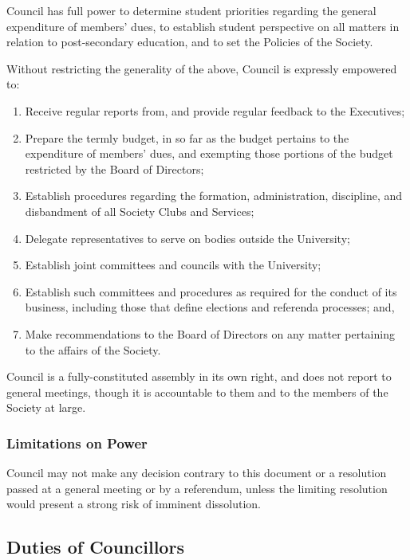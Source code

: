 Council has full power to determine student priorities regarding the
general expenditure of members’ dues, to establish student perspective on all
matters in relation to post-secondary education, and to set the Policies of the
Society.

Without restricting the generality of the above, Council is expressly
empowered to:
\begin{enumerate}
    \item Receive regular reports from, and provide regular feedback to the
        Executives;
    \item Prepare the termly budget, in so far as the budget pertains to the 
        expenditure of members’ dues, and
        exempting those portions of the budget restricted by the Board of 
        Directors;
    \item Establish procedures regarding the formation, administration,
        discipline, and disbandment of all Society Clubs and Services;
    \item Delegate representatives to serve on bodies outside the University;
    \item Establish joint committees and councils with the University;
    \item Establish such committees and procedures as required for the conduct
        of its business, including those that define elections and referenda
        processes; and,
    \item Make recommendations to the Board of Directors on any matter
        pertaining to the affairs of the Society.
\end{enumerate}

Council is a fully-constituted assembly in its own right,
and does not report to general meetings, though it is accountable to them and
to the members of the Society at large.

\subsubsection{Limitations on Power}
Council may not make any decision contrary to this document or a
resolution passed at a general meeting or by a referendum, unless the limiting
resolution would present a strong risk of imminent dissolution.

\subsection{Duties of Councillors}

